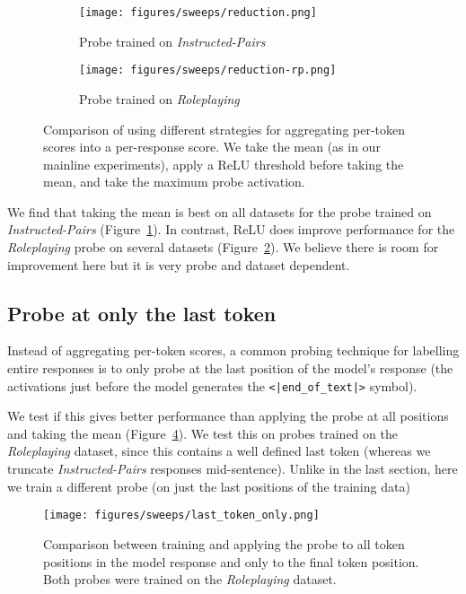 \documentclass{article}
\begin{document}
\begin{figure}[h]
    \centering
    \begin{subfigure}[b]{0.47\textwidth}
        \texttt{[image: figures/sweeps/reduction.png]}
        \caption{Probe trained on \textit{Instructed-Pairs}}
        \label{fig:aggregation-repe}
    \end{subfigure}
    \hfill
    \begin{subfigure}[b]{0.52\textwidth}
        \texttt{[image: figures/sweeps/reduction-rp.png]}
        \caption{Probe trained on \textit{Roleplaying}}
        \label{fig:aggregation-rp}
    \end{subfigure}
    \caption{Comparison of using different strategies for aggregating per-token scores into a per-response score. We take the mean (as in our mainline experiments), apply a ReLU threshold before taking the mean, and take the maximum probe activation.}
    \label{fig:aggregation}
\end{figure}

We find that taking the mean is best on all datasets for the probe trained on \textit{Instructed-Pairs} (Figure~\ref{fig:aggregation-repe}). In contrast, ReLU does improve performance for the \textit{Roleplaying} probe on several datasets  (Figure~\ref{fig:aggregation-rp}). We believe there is room for improvement here but it is very probe and dataset dependent.

\subsection{Probe at only the last token}\label{appx:last-token}
Instead of aggregating per-token scores, a common probing technique for labelling entire responses is to only probe at the last position of the model's response (the activations just before the model generates the \texttt{\textless{}|end\_of\_text|\textgreater{}} symbol).

We test if this gives better performance than applying the probe at all positions and taking the mean (Figure~\ref{fig:last-token}). We test this on probes trained on the \textit{Roleplaying} dataset, since this contains a well defined last token (whereas we truncate \textit{Instructed-Pairs} responses mid-sentence). Unlike in the last section, here we train a different probe (on just the last positions of the training data)

\begin{figure}[h]
    \centering
    \texttt{[image: figures/sweeps/last\_token\_only.png]}
    \caption{Comparison between training and applying the probe to all token positions in the model response and only to the final token position. Both probes were trained on the \textit{Roleplaying} dataset.}
    \label{fig:last-token}
\end{figure}
\end{document}
